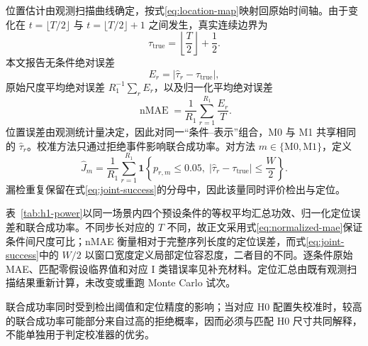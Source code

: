 位置估计由观测扫描曲线确定，按式\eqref{eq:location-map}映射回原始时间轴。由于变化在 $t=\lfloor T/2\rfloor$ 与 $t=\lfloor T/2\rfloor+1$ 之间发生，真实连续边界为
\begin{equation}\label{eq:true-location}
 \tau_{\mathrm{true}}=\left\lfloor\frac T2\right\rfloor+\frac12.
\end{equation}
本文报告无条件绝对误差
\[
 E_r=|\widehat\tau_r-\tau_{\mathrm{true}}|,
\]
原始尺度平均绝对误差 $R_1^{-1}\sum_rE_r$，以及归一化平均绝对误差
\begin{equation}\label{eq:normalized-mae}
 \operatorname{nMAE}
 =\frac1{R_1}\sum_{r=1}^{R_1}\frac{E_r}{T}.
\end{equation}
位置误差由观测统计量决定，因此对同一“条件--表示”组合，M0 与 M1 共享相同的 $\widehat\tau_r$。校准方法只通过拒绝事件影响联合成功率。对方法 $m\in\{\mathrm{M0},\mathrm{M1}\}$，定义
\begin{equation}\label{eq:joint-success}
 \widehat J_m
 =\frac1{R_1}\sum_{r=1}^{R_1}
 \mathbf1\left\{p_{r,m}\le0.05,\;
 |\widehat\tau_r-\tau_{\mathrm{true}}|\le\frac W2\right\}.
\end{equation}
漏检重复保留在式\eqref{eq:joint-success}的分母中，因此该量同时评价检出与定位。

表~\ref{tab:h1-power}以同一场景内四个预设条件的等权平均汇总功效、归一化定位误差和联合成功率。不同步长对应的 $T$ 不同，故正文采用式\eqref{eq:normalized-mae}保证条件间尺度可比；nMAE 衡量相对于完整序列长度的定位误差，而式\eqref{eq:joint-success}中的 $W/2$ 以窗口宽度定义局部定位容忍度，二者目的不同。逐条件原始 MAE、匹配零假设临界值和对应 I 类错误率见补充材料。定位汇总由既有观测扫描结果重新计算，未改变或重跑 Monte Carlo 试次。



联合成功率同时受到检出阈值和定位精度的影响；当对应 H0 配置失校准时，较高的联合成功率可能部分来自过高的拒绝概率，因而必须与匹配 H0 尺寸共同解释，不能单独用于判定校准器的优劣。

